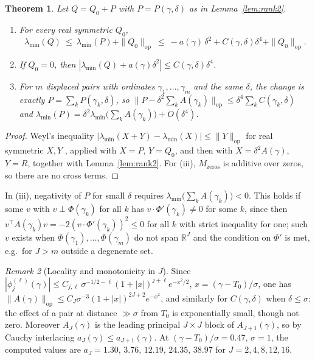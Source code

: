 \documentclass[11pt]{amsart}
\newtheorem{theorem}{Theorem}[section]
\theoremstyle{definition}
\theoremstyle{remark}
\newtheorem{remark}[theorem]{Remark}
\newcommand{\lmin}{\lambda_{\min}}
\newcommand{\Qzero}{Q_{0}}
\begin{document}
\begin{theorem}\label{thm:forced}
Let $Q=\Qzero+P$ with $P=P(\gamma,\delta)$ as in Lemma~\ref{lem:rank2}.
\begin{enumerate}[label=\textup{(\roman*)}]
\item For every real symmetric $\Qzero$,
\begin{equation}\label{eq:forced}
  \lmin(Q)\ \le\ \lmin(P)+\|\Qzero\|_{\mathrm{op}}
  \ \le\ -a(\gamma)\,\delta^{2}+C(\gamma,\delta)\delta^{4}+\|\Qzero\|_{\mathrm{op}}.
\end{equation}
\item If $\Qzero=0$, then $|\lmin(Q)+a(\gamma)\delta^2|\le C(\gamma,\delta)\delta^4$.
\item For $m$ displaced pairs with ordinates $\gamma_1,\dots,\gamma_m$ and the
same $\delta$, the change is exactly $P=\sum_kP(\gamma_k,\delta)$, so
$\|P-\delta^2\sum_kA(\gamma_k)\|_{\mathrm{op}}\le\delta^4\sum_kC(\gamma_k,\delta)$ and
$\lmin(P)=\delta^{2}\lmin\bigl(\sum_kA(\gamma_k)\bigr)+O(\delta^{4})$.
\end{enumerate}
\end{theorem}

\begin{proof}
Weyl's inequality $|\lmin(X+Y)-\lmin(X)|\le\|Y\|_{\mathrm{op}}$ for real
symmetric $X,Y$ \cite[Thm.~4.3.1]{HJ}, applied with $X=P$, $Y=\Qzero$, and
then with $X=\delta^2A(\gamma)$, $Y=R$, together with Lemma~\ref{lem:rank2}.
For (iii), $M_{\mathrm{zeros}}$ is additive over zeros, so there are no
cross terms.
\end{proof}

In (iii), negativity of $P$ for small $\delta$ requires
$\lmin\bigl(\sum_kA(\gamma_k)\bigr)<0$. This holds if some $v$ with
$v\perp\Phi(\gamma_k)$ for all $k$ has $v\cdot\Phi'(\gamma_k)\ne0$ for some
$k$, since then $v^{\top}A(\gamma_k)v=-2(v\cdot\Phi'(\gamma_k))^2\le0$ for
all $k$ with strict inequality for one; such $v$ exists when
$\Phi(\gamma_1),\dots,\Phi(\gamma_m)$ do not span $\mathbb R^J$ and the
condition on $\Phi'$ is met, e.g.\ for $J>m$ outside a degenerate set.

\begin{remark}[Locality and monotonicity in $J$]\label{rem:locality}
Since $|\phi_j^{(\ell)}(\gamma)|\le C_{j,\ell}\,\sigma^{-1/2-\ell}(1+|x|)^{j+\ell}e^{-x^2/2}$,
$x=(\gamma-T_0)/\sigma$, one has
$\|A(\gamma)\|_{\mathrm{op}}\le C_J\sigma^{-3}(1+|x|)^{2J+2}e^{-x^{2}}$, and
similarly for $C(\gamma,\delta)$ when $\delta\le\sigma$: the effect of a pair
at distance $\gg\sigma$ from $T_0$ is exponentially small, though not zero.
Moreover $A_J(\gamma)$ is the leading principal $J\times J$ block of
$A_{J+1}(\gamma)$, so by Cauchy interlacing \cite[Thm.~4.3.28]{HJ}
$a_J(\gamma)\le a_{J+1}(\gamma)$. At $(\gamma-T_0)/\sigma=0.47$, $\sigma=1$,
the computed values are $a_J=1.30,\,3.76,\,12.19,\,24.35,\,38.97$ for
$J=2,4,8,12,16$.
\end{remark}
\end{document}
